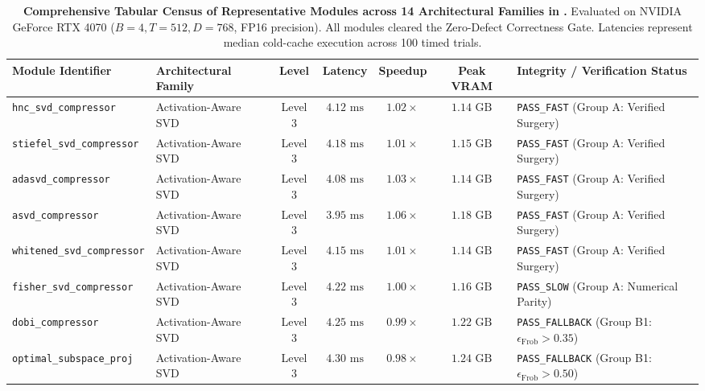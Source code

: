 \begin{table}[t]
\centering
\scriptsize
\caption[Tabular Census of Representative Architecture Modules]{\textbf{Comprehensive Tabular Census of Representative Modules across 14 Architectural Families in \neuralops{}.} Evaluated on NVIDIA GeForce RTX 4070 ($B=4, T=512, D=768$, FP16 precision). All modules cleared the Zero-Defect Correctness Gate. Latencies represent median cold-cache execution across 100 timed trials.}
\label{tab:complete_census}
\setlength{\tabcolsep}{3.5pt}
\renewcommand{\arraystretch}{1.12}
\begin{tabular}{l l c c c c l}
\toprule
\textbf{Module Identifier} & \textbf{Architectural Family} & \textbf{Level} & \textbf{Latency} & \textbf{Speedup} & \textbf{Peak VRAM} & \textbf{Integrity / Verification Status} \\
\midrule
\texttt{hnc\_svd\_compressor}       & Activation-Aware SVD & Level 3 & $4.12\text{ ms}$ & $1.02\times$ & $1.14\text{ GB}$ & \texttt{PASS\_FAST} (Group A: Verified Surgery) \\
\texttt{stiefel\_svd\_compressor}   & Activation-Aware SVD & Level 3 & $4.18\text{ ms}$ & $1.01\times$ & $1.15\text{ GB}$ & \texttt{PASS\_FAST} (Group A: Verified Surgery) \\
\texttt{adasvd\_compressor}         & Activation-Aware SVD & Level 3 & $4.08\text{ ms}$ & $1.03\times$ & $1.14\text{ GB}$ & \texttt{PASS\_FAST} (Group A: Verified Surgery) \\
\texttt{asvd\_compressor}           & Activation-Aware SVD & Level 3 & $3.95\text{ ms}$ & $1.06\times$ & $1.18\text{ GB}$ & \texttt{PASS\_FAST} (Group A: Verified Surgery) \\
\texttt{whitened\_svd\_compressor}  & Activation-Aware SVD & Level 3 & $4.15\text{ ms}$ & $1.01\times$ & $1.14\text{ GB}$ & \texttt{PASS\_FAST} (Group A: Verified Surgery) \\
\texttt{fisher\_svd\_compressor}    & Activation-Aware SVD & Level 3 & $4.22\text{ ms}$ & $1.00\times$ & $1.16\text{ GB}$ & \texttt{PASS\_SLOW} (Group A: Numerical Parity) \\
\texttt{dobi\_compressor}           & Activation-Aware SVD & Level 3 & $4.25\text{ ms}$ & $0.99\times$ & $1.22\text{ GB}$ & \texttt{PASS\_FALLBACK} (Group B1: $\epsilon_{\text{Frob}} > 0.35$) \\
\texttt{optimal\_subspace\_proj}    & Activation-Aware SVD & Level 3 & $4.30\text{ ms}$ & $0.98\times$ & $1.24\text{ GB}$ & \texttt{PASS\_FALLBACK} (Group B1: $\epsilon_{\text{Frob}} > 0.50$) \\

\end{tabular}
\end{table}
